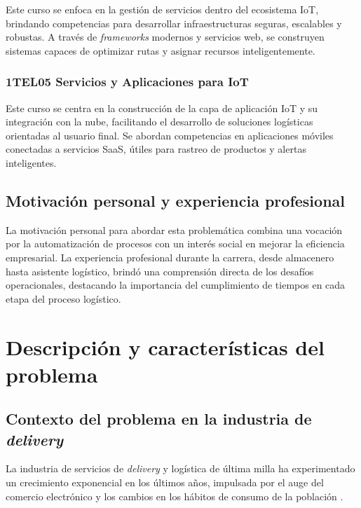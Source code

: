 Este curso se enfoca en la gestión de servicios dentro del ecosistema IoT, brindando competencias para desarrollar infraestructuras seguras, escalables y robustas. A través de \textit{frameworks} modernos y servicios web, se construyen sistemas capaces de optimizar rutas y asignar recursos inteligentemente.

\subsubsection{1TEL05 Servicios y Aplicaciones para IoT}

Este curso se centra en la construcción de la capa de aplicación IoT y su integración con la nube, facilitando el desarrollo de soluciones logísticas orientadas al usuario final. Se abordan competencias en aplicaciones móviles conectadas a servicios SaaS, útiles para rastreo de productos y alertas inteligentes.

\subsection{Motivación personal y experiencia profesional}

La motivación personal para abordar esta problemática combina una vocación por la automatización de procesos con un interés social en mejorar la eficiencia empresarial. La experiencia profesional durante la carrera, desde almacenero hasta asistente logístico, brindó una comprensión directa de los desafíos operacionales, destacando la importancia del cumplimiento de tiempos en cada etapa del proceso logístico.

\section{Descripción y características del problema}

\subsection{Contexto del problema en la industria de \textit{delivery}}

La industria de servicios de \textit{delivery} y logística de última milla ha experimentado un crecimiento exponencial en los últimos años, impulsada por el auge del comercio electrónico y los cambios en los hábitos de consumo de la población \cite{RedacciponTLW2025}. 


